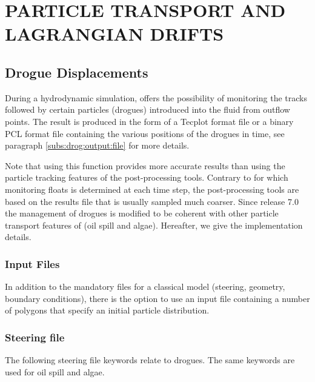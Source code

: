 \chapter{ PARTICLE TRANSPORT AND LAGRANGIAN DRIFTS}
\label{ch:part:transp}

\section{ Drogue Displacements}
\label{sec:drog:displ}
 During a hydrodynamic simulation,  offers the possibility of monitoring the tracks followed by certain particles (drogues) introduced into the fluid from outflow points. The result is produced in the form of a Tecplot format file or a binary PCL format file containing the various positions of the drogues in time, see paragraph \ref{subs:drog:output:file} for more details.

 Note that using this function provides more accurate results than using the particle tracking features of the post-processing tools. Contrary to  for which monitoring floats is determined at each time step, the post-processing tools are based on the results file that is usually sampled much coarser. Since release 7.0 the management of drogues is modified to be coherent with other particle transport features of  (oil spill and algae). Hereafter, we give the implementation details.

\subsection{ Input Files}
\label{subs:drog:inp:fil}
 In addition to the mandatory files for a classical  model (steering, geometry, boundary conditions), there is the option to use an input file containing a number of polygons that specify an initial particle distribution.

\subsection{ Steering file}
\label{subs:drog:steer:file}
 The following steering file keywords relate to drogues.  The same keywords are used for oil spill and algae.

